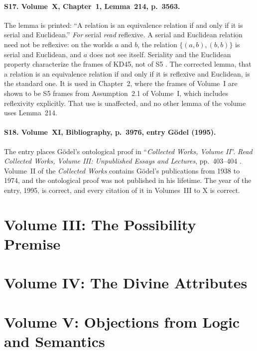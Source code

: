 \documentclass{situationist-preprint}
\begin{document}
\paragraph{S17. Volume~X, Chapter~1, Lemma~214, p.~3563.} The lemma is printed: \enquote{A relation is an equivalence relation if and only if it is serial and Euclidean.} \textit{For} serial \textit{read} reflexive. A serial and Euclidean relation need not be reflexive: on the worlds $a$ and $b$, the relation $\{(a,b), (b,b)\}$ is serial and Euclidean, and $a$ does not see itself. Seriality and the Euclidean property characterize the frames of KD45, not of S5 \citep{Chellas1980,HughesCresswell1996}. The corrected lemma, that a relation is an equivalence relation if and only if it is reflexive and Euclidean, is the standard one. It is used in Chapter~2, where the frames of Volume~I are shown to be S5 frames from Assumption~2.1 of Volume~I, which includes reflexivity explicitly. That use is unaffected, and no other lemma of the volume uses Lemma~214.

\paragraph{S18. Volume~XI, Bibliography, p.~3976, entry Gödel (1995).} The entry places Gödel's ontological proof in \enquote{\emph{Collected Works, Volume II}}. \textit{Read} \emph{Collected Works, Volume III: Unpublished Essays and Lectures}, pp.~403--404 \citep{Godel1995}. Volume~II of the \emph{Collected Works} contains Gödel's publications from 1938 to 1974, and the ontological proof was not published in his lifetime. The year of the entry, 1995, is correct, and every citation of it in Volumes~III to X is correct.

\section{Volume III: The Possibility Premise}\label{s:vol3}


\section{Volume IV: The Divine Attributes}\label{s:vol4}


\section{Volume V: Objections from Logic and Semantics}\label{s:vol5}

\end{document}
